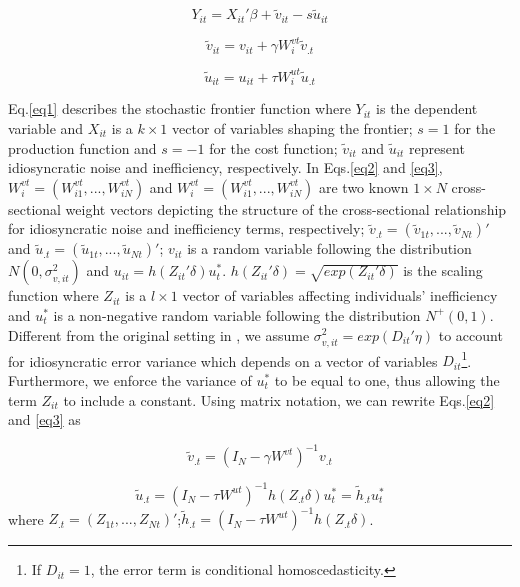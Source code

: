 \begin{equation}\label{eq1}
 Y_{it} = X_{it}'\beta + \tilde{v}_{it}-s\tilde{u}_{it}
\end{equation}

\begin{equation}\label{eq2}
	\tilde{v}_{it} =v_{it}+ \gamma W_{i}^{vt}\tilde{v}_{.t} 
\end{equation}

\begin{equation}\label{eq3}
	\tilde{u}_{it} =u_{it}+ \tau W_{i}^{ut}\tilde{u}_{.t} 
\end{equation}

  Eq.\eqref{eq1}  describes the stochastic frontier function where $Y_{it}$ is the dependent variable and $X_{it}$ is a $k \times 1$ vector of variables shaping the frontier; $s=1$ for the production function and  $s=-1$ for the cost function; $\tilde{v}_{it}$ and $\tilde{u}_{it}$ represent  idiosyncratic noise and inefficiency, respectively. In  Eqs.\eqref{eq2} and \eqref{eq3}, $W_{i}^{vt}=(W_{i1}^{vt},...,W_{iN}^{vt})$ and $W_{i}^{vt}=(W_{i1}^{vt},...,W_{iN}^{vt})$ are two known $1 \times N$ cross-sectional weight vectors  depicting the structure of the  cross-sectional relationship for idiosyncratic noise and inefficiency terms, respectively; $\tilde{v}_{.t}=(\tilde{v}_{1t},...,\tilde{v}_{Nt})' $ and $\tilde{u}_{.t}=(\tilde{u}_{1t},...,\tilde{u}_{Nt})'$; $v_{it}$  is a random variable following the distribution $N(0,\sigma_{v,it}^2)$ and $u_{it}=h(Z_{it}'\delta)u_t^*$. $h(Z_{it}'\delta)=\sqrt{exp(Z_{it}'\delta)}$ is the scaling function where $Z_{it}$ is a $l \times 1$ vector of variables affecting individuals' inefficiency  and $u_t^*$ is a non-negative random variable following the distribution $N^+(0,1)$.  Different from the original setting in \cite{orea2019new}, we assume $\sigma_{v,it}^2=exp(D_{it}'\eta)$ to account for idiosyncratic error variance which depends on a vector of variables $D_{it}$\footnote{If $D_{it}=1$, the error term is conditional homoscedasticity.}. Furthermore, we enforce the variance of $u_t^*$ to be equal to one, thus allowing the term $Z_{it}$ to include a constant. Using matrix notation, we can rewrite Eqs.\eqref{eq2} and \eqref{eq3} as
 
 \begin{equation}\label{eq2b}
 	\tilde{v}_{.t} =(I_N-\gamma W^{vt})^{-1}v_{.t} 
 \end{equation}
 
 \begin{equation}\label{eq3b}
 	\tilde{u}_{.t} =(I_N-\tau W^{ut})^{-1}h(Z_{.t}\delta)u_t^* = \tilde{h}_{.t}u_t^*
 \end{equation}
 where $Z_{.t}=(Z_{1t},...,Z_{Nt})'$;$\tilde{h}_{.t}=(I_N-\tau W^{ut})^{-1}h(Z_{.t}\delta)$.
 
